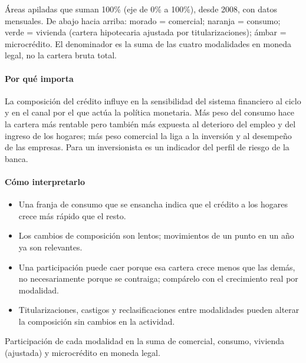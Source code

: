 \begin{leer}
Áreas apiladas que suman 100\% (eje de 0\% a 100\%), desde 2008, con datos mensuales. De abajo hacia arriba: morado = comercial; naranja = consumo; verde = vivienda (cartera hipotecaria ajustada por titularizaciones); ámbar = microcrédito. El denominador es la suma de las cuatro modalidades en moneda legal, no la cartera bruta total.
\end{leer}

\paragraph{Por qué importa}
La composición del crédito influye en la sensibilidad del sistema financiero al ciclo y en el canal por el que actúa la política monetaria. Más peso del consumo hace la cartera más rentable pero también más expuesta al deterioro del empleo y del ingreso de los hogares; más peso comercial la liga a la inversión y al desempeño de las empresas. Para un inversionista es un indicador del perfil de riesgo de la banca.

\paragraph{Cómo interpretarlo}
\begin{itemize}
\item Una franja de consumo que se ensancha indica que el crédito a los hogares crece más rápido que el resto.
\item Los cambios de composición son lentos; movimientos de un punto en un año ya son relevantes.
\item Una participación puede caer porque esa cartera crece menos que las demás, no necesariamente porque se contraiga; compárelo con el crecimiento real por modalidad.
\item Titularizaciones, castigos y reclasificaciones entre modalidades pueden alterar la composición sin cambios en la actividad.
\end{itemize}
\begin{formulas}[Fórmulas]
\end{formulas}
\begin{metodo}[Metodología]
Participación de cada modalidad en la suma de comercial, consumo, vivienda (ajustada) y microcrédito en moneda legal.
\par{}
\end{metodo}

